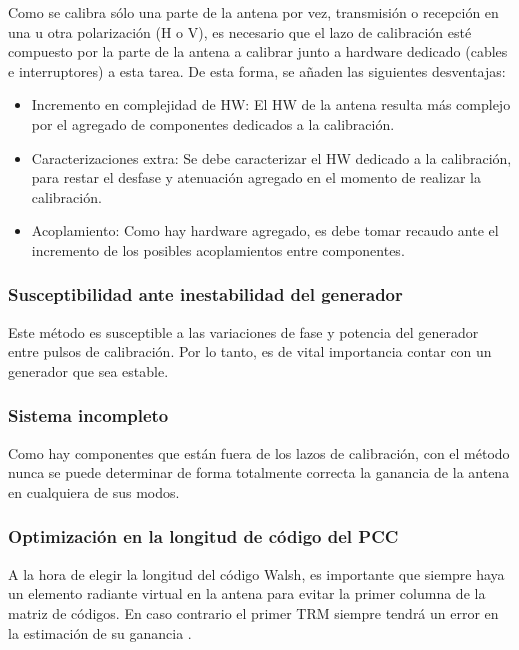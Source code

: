 Como se calibra sólo una parte de la antena por vez, transmisión o recepción en una u otra polarización (H o V), es necesario
que el lazo de calibración esté compuesto por la parte de la antena a calibrar junto a hardware dedicado (cables e interruptores) a
esta tarea. De esta forma, se añaden las siguientes desventajas:

\begin{itemize}
	\item Incremento en complejidad de HW: El HW de la antena resulta más complejo por el agregado de componentes dedicados a la
		calibración.
	\item Caracterizaciones extra: Se debe caracterizar el HW dedicado a la calibración, para restar el desfase y atenuación
		agregado en el momento de realizar la calibración.
	\item Acoplamiento: Como hay hardware agregado, es debe tomar recaudo ante el incremento de los posibles acoplamientos entre
		componentes.	
\end{itemize}


\subsubsection{Susceptibilidad ante inestabilidad del generador}

Este método es susceptible a las variaciones de fase y potencia del generador entre pulsos de calibración. Por lo tanto, es de
vital importancia contar con un generador que sea estable.


\subsubsection{Sistema incompleto}

Como hay componentes que están fuera de los lazos de calibración, con el método nunca se puede determinar de forma totalmente
correcta la ganancia de la antena en cualquiera de sus modos.


\subsubsection{Optimización en la longitud de código del PCC}

A la hora de elegir la longitud del código Walsh, es importante que siempre haya un elemento radiante virtual en la antena para
evitar la primer columna de la matriz de códigos. En caso contrario el primer TRM siempre tendrá un error en la estimación de
su ganancia \cite{Wang2010}.


